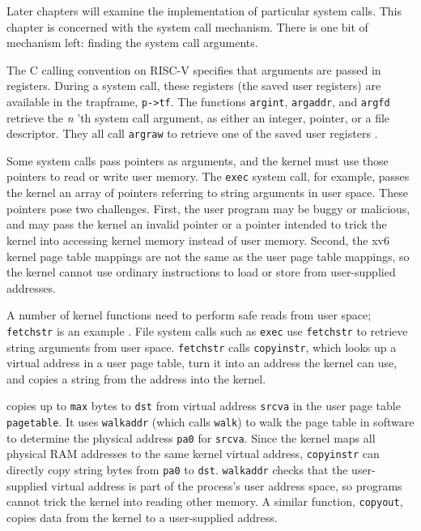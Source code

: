 Later chapters will examine the implementation of
particular system calls.
This chapter is concerned with the system call mechanism.
There is one bit of mechanism left: finding the system call arguments.

The C calling convention on RISC-V specifies that arguments are
passed in registers.
During a system call, these registers (the saved user registers)
are available in the trapframe, {\tt p->tf}.
The functions
\lstinline{argint},
\lstinline{argaddr},
and
\lstinline{argfd}
retrieve the 
\textit{n} 'th 
system call
argument, as either an integer, pointer, or a file descriptor.
They all call {\tt argraw} to retrieve one of the saved
user registers
.

Some system calls pass pointers as arguments, and the kernel must use
those pointers to read or write user memory. The {\tt exec} system
call, for example, passes the kernel an array of pointers
referring to string arguments in user space.
These pointers pose
two challenges. First, the user program may be buggy or malicious, and
may pass the kernel an invalid pointer or a pointer intended to trick
the kernel into accessing kernel memory instead of user memory.
Second, the xv6 kernel page table mappings are not the same as the
user page table mappings, so the kernel cannot use ordinary
instructions to load or store from user-supplied addresses.

A number of kernel functions need to perform safe reads from user space; {\tt
  fetchstr} is an example .
File system calls such as
{\tt exec} use {\tt fetchstr} to retrieve string arguments from user
space.
\lstinline{fetchstr} calls \lstinline{copyinstr},
which looks up a virtual address in a user page
table, turn it into an address the kernel can use,
and copies a string from the address into the kernel.

 copies up to \lstinline{max} bytes to
\lstinline{dst} from virtual address \lstinline{srcva} in the user page
table \lstinline{pagetable}.  It uses {\tt walkaddr}
(which calls {\tt walk}) to walk the page table in software to
determine the physical address \lstinline{pa0} for \lstinline{srcva}.
Since the kernel maps all physical RAM addresses to the same
kernel virtual address,
{\tt copyinstr} can directly copy string bytes from {\tt pa0} to {\tt dst}.
{\tt walkaddr} 
checks that the user-supplied virtual address is part of
the process's user address space, so programs
cannot trick the kernel into reading other memory.
A similar function, {\tt copyout}, copies data from the
kernel to a user-supplied address.

